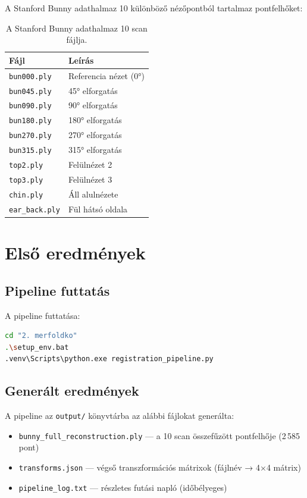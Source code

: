 \documentclass[12pt,a4paper]{article}
\begin{document}
A Stanford Bunny adathalmaz \cite{open3d2018} 10 különböző nézőpontból tartalmaz pontfelhőket:

\begin{table}[H]
\centering
\begin{tabular}{ll}
\toprule
\textbf{Fájl} & \textbf{Leírás} \\
\midrule
\texttt{bun000.ply} & Referencia nézet (0°) \\
\texttt{bun045.ply} & 45° elforgatás \\
\texttt{bun090.ply} & 90° elforgatás \\
\texttt{bun180.ply} & 180° elforgatás \\
\texttt{bun270.ply} & 270° elforgatás \\
\texttt{bun315.ply} & 315° elforgatás \\
\texttt{top2.ply}   & Felülnézet 2 \\
\texttt{top3.ply}   & Felülnézet 3 \\
\texttt{chin.ply}   & Áll alulnézete \\
\texttt{ear\_back.ply} & Fül hátsó oldala \\
\bottomrule
\end{tabular}
\caption{A Stanford Bunny adathalmaz 10 scan fájlja.}
\end{table}

\section{Első eredmények}

\subsection{Pipeline futtatás}

A pipeline futtatása:
\begin{lstlisting}[language=bash]
cd "2. merfoldko"
.\setup_env.bat
.venv\Scripts\python.exe registration_pipeline.py
\end{lstlisting}

\subsection{Generált eredmények}

A pipeline az \texttt{output/} könyvtárba az alábbi fájlokat generálta:

\begin{itemize}[nosep]
    \item \texttt{bunny\_full\_reconstruction.ply} — a 10 scan összefűzött pontfelhője (2\,585 pont)
    \item \texttt{transforms.json} — végső transzformációs mátrixok (fájlnév → 4$\times$4 mátrix)
    \item \texttt{pipeline\_log.txt} — részletes futási napló (időbélyeges)
\end{itemize}
\end{document}
